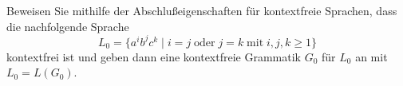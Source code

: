 
\begin{exercise}
Beweisen Sie mithilfe der Abschlu\ss{}eigenschaften f\"ur kontextfreie Sprachen,
dass die nachfolgende Sprache $$L_0=\{a^ib^jc^k \mid i=j \;\text{oder}\; j=k\;\text{mit}\;i,j,k\ge 1\}$$
kontextfrei ist und geben dann eine kontextfreie Grammatik $G_0$ für $L_0$ an mit $L_0=L(G_0)$.
\end{exercise}
